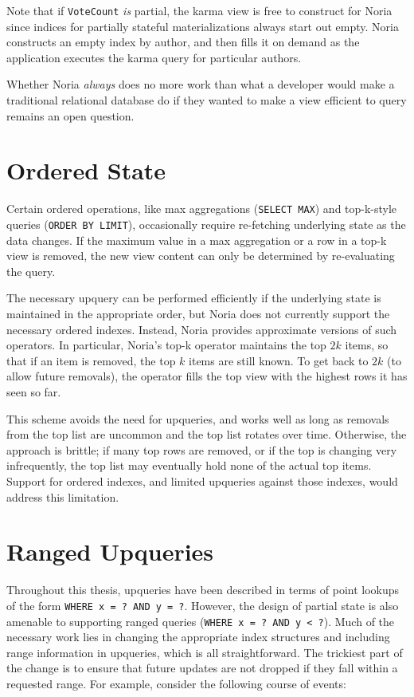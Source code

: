 Note that if \texttt{VoteCount} \emph{is} partial, the karma view is free to
construct for Noria since indices for partially stateful materializations always
start out empty. Noria constructs an empty index by author, and then fills it on
demand as the application executes the karma query for particular authors.

Whether Noria \emph{always} does no more work than what a developer would
make a traditional relational database do if they wanted to make a view
efficient to query remains an open question.

\section{Ordered State}
\label{s:disc:ordered}

Certain ordered operations, like max aggregations (\texttt{SELECT MAX}) and
top-k-style queries (\texttt{ORDER BY LIMIT}), occasionally require re-fetching
underlying state as the data changes. If the maximum value in a max aggregation
or a row in a top-k view is removed, the new view content can only be determined
by re-evaluating the query.

The necessary upquery can be performed efficiently if the underlying state is
maintained in the appropriate order, but Noria does not currently support the
necessary ordered indexes. Instead, Noria provides approximate versions of such
operators. In particular, Noria's top-k operator maintains the top $2k$ items,
so that if an item is removed, the top $k$ items are still known. To get back to
$2k$ (to allow future removals), the operator fills the top view with the
highest rows it has seen so far.

This scheme avoids the need for upqueries, and works well as long as removals
from the top list are uncommon and the top list rotates over time. Otherwise,
the approach is brittle; if many top rows are removed, or if the top is changing
very infrequently, the top list may eventually hold none of the actual top
items. Support for ordered indexes, and limited upqueries against those indexes,
would address this limitation.

\section{Ranged Upqueries}
\label{s:disc:ranged}

Throughout this thesis, upqueries have been described in terms of point lookups
of the form \texttt{WHERE x = ? AND y = ?}. However, the design of partial state
is also amenable to supporting ranged queries (\texttt{WHERE x = ? AND y < ?}).
Much of the necessary work lies in changing the appropriate index structures and
including range information in upqueries, which is all straightforward. The
trickiest part of the change is to ensure that future updates are not dropped if
they fall within a requested range. For example, consider the following course
of events:


